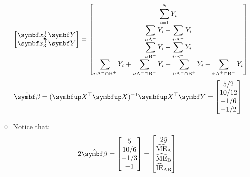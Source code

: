 \begin{itemize}
\begin{itemize}
\[\begin{bmatrix}
                                    \Vector{x}_2^\top \RandomVector{Y} \\
                                    \Vector{x}_3^\top \RandomVector{Y}
                              \end{bmatrix}=\begin{bmatrix}
                                    \displaystyle \sum_{i=1}^{N} Y_i                            \\
                                    \displaystyle \sum_{i:\text{A}^+}Y_i-\sum_{i:\text{A}^-}Y_i \\
                                    \displaystyle \sum_{i:\text{B}^+}Y_i-\sum_{i:\text{B}^-}Y_i \\
                                    \displaystyle \sum_{i:\text{A}^+\cap\text{B}^+}Y_i+\sum_{i:\text{A}^-\cap\text{B}^-}Y_i-\sum_{i:\text{A}^-\cap\text{B}^+}Y_i-\sum_{i:\text{A}^+\cap\text{B}^-}Y_i
                              \end{bmatrix} \]
                        \[ \hat{\RandomVector{\beta}}=(\Matrix{X}^\top\Matrix{X})^{-1}\Matrix{X}^\top \RandomVector{Y}=\begin{bmatrix}
                                    5/2   \\
                                    10/12 \\
                                    -1/6  \\
                                    -1/2
                              \end{bmatrix} \]
                  \item Notice that:
                        \[ 2\hat{\RandomVector{\beta}}=\begin{bmatrix}
                                    5    \\
                                    10/6 \\
                                    -1/3 \\
                                    -1
                              \end{bmatrix}=\begin{bmatrix}
                                    2\bar{y}                       \\
                                    \widehat{\text{ME}}_{\text{A}} \\
                                    \widehat{\text{ME}}_{\text{B}} \\
                                    \widehat{\text{IE}}_{\text{AB}}

\end{bmatrix}\]
\end{itemize}
\end{itemize}

